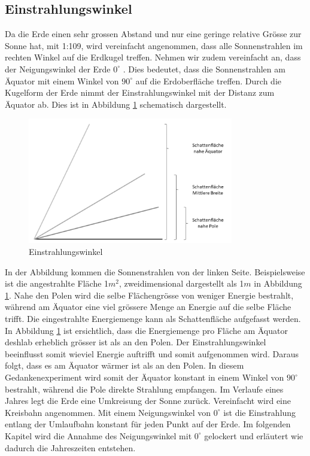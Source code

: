 \begin{refsection}
\section{Einstrahlungswinkel}\label{sec:winkel} 
Da die Erde einen sehr grossen Abstand und nur eine geringe relative Grösse zur Sonne hat, mit 1:109, wird vereinfacht angenommen, dass alle Sonnenstrahlen im rechten Winkel auf die Erdkugel treffen. Nehmen wir zudem vereinfacht an, dass der Neigungswinkel der Erde $0^\circ$ . Dies bedeutet, dass die Sonnenstrahlen am Äquator mit einem Winkel von $90^\circ$ auf die Erdoberfläche treffen. Durch die Kugelform der Erde nimmt der Einstrahlungswinkel mit der Distanz zum Äquator ab. Dies ist in Abbildung \ref{fig:abb5} schematisch dargestellt. 
%
\begin{figure}
	\centering
	\includegraphics[width= 0.8\textwidth]{Schatten.png}
	\caption[Einstrahlungswinkel]{Einstrahlungswinkel}
	\label{fig:abb5}
\end{figure}
In der Abbildung kommen die Sonnenstrahlen von der linken Seite. Beispielsweise ist die angestrahlte Fläche 1$m^2$, zweidimensional dargestellt als 1$m$ in Abbildung \ref{fig:abb5}. Nahe den Polen wird die selbe Flächengrösse von weniger Energie bestrahlt, während am Äquator eine viel grössere Menge an Energie auf die selbe Fläche trifft. Die eingestrahlte Energiemenge kann als Schattenfläche aufgefasst werden. In Abbildung \ref{fig:abb5} ist ersichtlich, dass die Energiemenge pro Fläche am Äquator deshlab erheblich grösser ist als an den Polen. Der Einstrahlungswinkel beeinflusst somit wieviel Energie auftrifft und somit aufgenommen wird. Daraus folgt, dass es am Äquator wärmer ist als an den Polen. 
In diesem Gedankenexperiment wird somit der Äquator konstant in einem Winkel von $90^\circ$ bestrahlt, während die Pole direkte Strahlung empfangen. Im Verlaufe eines Jahres legt die Erde eine Umkreisung der Sonne zurück. Vereinfacht wird eine Kreisbahn angenommen. Mit einem Neigungswinkel von $0^\circ$ ist die Einstrahlung entlang der Umlaufbahn konstant für jeden Punkt auf der Erde. Im folgenden Kapitel wird die Annahme des Neigungswinkel mit $0^\circ$ gelockert und erläutert wie dadurch die Jahreszeiten entstehen.
\newpage


\end{refsection}
